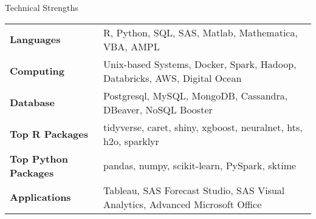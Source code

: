\documentclass{resume} %
\begin{document}
\begin{rSection}{Technical Strengths}

\begin{tabular}{ @{} >{\bfseries}l @{\hspace{6ex}} l }
Languages & R, Python, SQL, SAS, Matlab, Mathematica, VBA, AMPL  \\
Computing & Unix-based Systems, Docker, Spark, Hadoop, Databricks, AWS, Digital Ocean\\
Database & Postgresql, MySQL, MongoDB, Cassandra, DBeaver, NoSQL Booster \\
Top R Packages &  tidyverse, caret, shiny, xgboost, neuralnet, hts, h2o, sparklyr  \\
Top Python Packages & pandas, numpy, scikit-learn, PySpark, sktime   \\
Applications & Tableau,  SAS Forecast Studio, SAS Visual Analytics, Advanced Microsoft Office \\
\end{tabular}

\end{rSection}

\pagebreak

\end{document}
